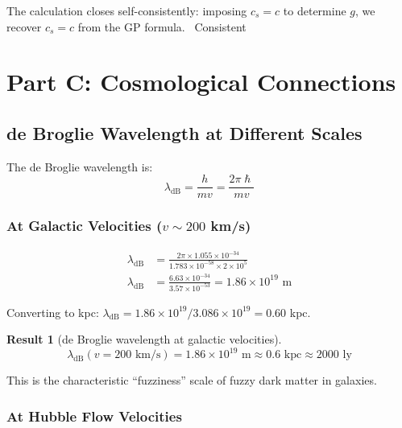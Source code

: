\documentclass[11pt,a4paper]{article}
\newcommand{\ee}[1]{\times 10^{#1}}
\newcommand{\hbar}{\ensuremath{\hslash}}
\newcommand{\lambdadB}{\ensuremath{\lambda_{\mathrm{dB}}}}
\newcommand{\CONSISTENT}{\textcolor{green!60!black}{\checkmark~Consistent}}
\newtheorem{result}{Result}
\begin{document}
The calculation closes self-consistently: imposing $c_s = c$ to determine $g$, we recover $c_s = c$ from the GP formula. \CONSISTENT

\section{Part C: Cosmological Connections}
\label{sec:partC}

\subsection{de Broglie Wavelength at Different Scales}

The de Broglie wavelength is:
\begin{equation}
\lambdadB = \frac{h}{mv} = \frac{2\pi\hbar}{mv}
\end{equation}

\subsubsection{At Galactic Velocities ($v \sim 200$ km/s)}

\begin{align}
\lambdadB &= \frac{2\pi \times 1.055 \ee{-34}}{1.783 \ee{-58} \times 2 \ee{5}} \nonumber \\
\lambdadB &= \frac{6.63 \ee{-34}}{3.57 \ee{-53}} = 1.86 \ee{19} \text{ m}
\end{align}

Converting to kpc: $\lambdadB = 1.86 \ee{19} / 3.086 \ee{19} = 0.60$ kpc.

\begin{result}[de Broglie wavelength at galactic velocities]
\begin{equation}
\boxed{\lambdadB(v = 200 \text{ km/s}) = 1.86 \times 10^{19} \text{ m} \approx 0.6 \text{ kpc} \approx 2000 \text{ ly}}
\end{equation}
\end{result}

This is the characteristic ``fuzziness'' scale of fuzzy dark matter in galaxies.

\subsubsection{At Hubble Flow Velocities}
\end{document}
